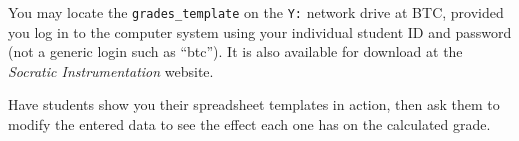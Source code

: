 
You may locate the {\tt grades\_template} on the {\tt Y:} network drive at BTC, provided you log in to the computer system using your individual student ID and password (not a generic login such as ``btc'').  It is also available for download at the {\it Socratic Instrumentation} website.







Have students show you their spreadsheet templates in action, then ask them to modify the entered data to see the effect each one has on the calculated grade.



